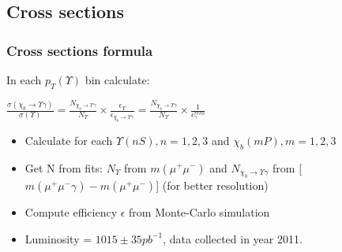 \documentclass{beamer}
\begin{document}
\subsection{Cross sections}
\begin{frame}
\frametitle{Cross sections formula}
In each $p_T(\Upsilon)$ bin calculate:
\begin{center}
$\frac{\sigma(\chi_{b} \rightarrow \Upsilon \gamma)}{\sigma(\Upsilon)} = \frac{N_{\chi_b \rightarrow \Upsilon \gamma}}{N_{\Upsilon}} \times \frac{\epsilon_{\Upsilon}}{\epsilon_{\chi_b \rightarrow \Upsilon \gamma}} = \frac{N_{\chi_b \rightarrow \Upsilon \gamma}}{N_{\Upsilon}} \times \frac{1}{\epsilon_{\gamma}^{reco}}$
\end{center}
\begin{itemize}
  \item Calculate for each $\Upsilon(nS), n=1,2,3$ and $\chi_b(mP), m=1,2,3$
  \item Get N from fits: $N_{\Upsilon}$ from  $m(\mu^+ \mu^-)$ and $N_{\chi_b \rightarrow \Upsilon \gamma}$ from [$m(\mu^+ \mu^- \gamma) - m(\mu^+ \mu^-)$] (for better resolution)
  \item Compute efficiency $\epsilon$  from Monte-Carlo simulation
  \item Luminosity = $1015 \pm 35 pb^{-1}$, data collected in year 2011.
\end{itemize}
\end{frame}
\end{document}

